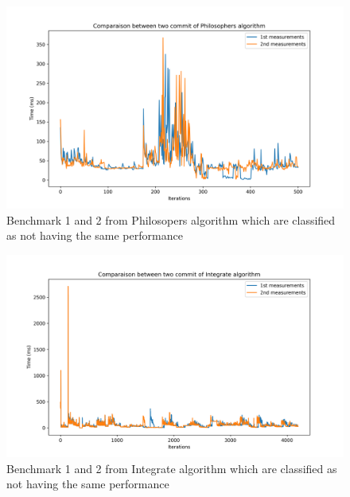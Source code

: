 \documentclass{article}
\begin{document}
\begin{figure}[]
    \centering
    \includegraphics[width=1\textwidth]{images/plot_Philosophers_42.533000000000015.png}
    \caption{Benchmark 1 and 2 from Philosopers algorithm which are classified as not having the same performance}
    \label{fig:bench_1_2_2}
\end{figure}

\begin{figure}[]
    \centering
    \includegraphics[width=1\textwidth]{images/plot_Integrate_159.78600000000006.png}
    \caption{Benchmark 1 and 2 from Integrate algorithm which are classified as not having the same performance}
    \label{fig:bench_1_2_3}
\end{figure}
\end{document}
